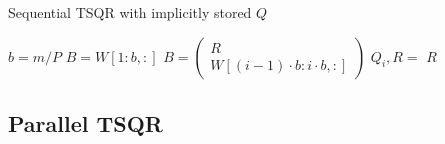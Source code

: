 \documentclass{article}
\begin{document}
\begin{algorithm}[t]
    \caption{Sequential TSQR with implicitly stored $Q$} \label{tsqr:sequential}
    \begin{algorithmic}[1]
        \State $b = m / P$
        \State $B = W[1 : b, :]$
                \State $B = \left(\begin{smallmatrix} R \\ W[(i-1) \cdot b : i \cdot b, :]
                \end{smallmatrix}\right)$
            \EndIf
            \State $Q_i, R =$ 
        \EndFor
        \State \Return $R$
    \end{algorithmic}
\end{algorithm}

\subsection{Parallel TSQR}
\end{document}
